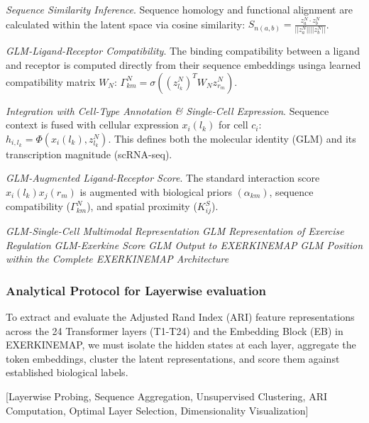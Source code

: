 \documentclass[11pt]{article}
\begin{document}
\textit{Sequence Similarity Inference}. Sequence homology and functional alignment are calculated within the latent space via cosine similarity: $S_{n(a,b)} = \frac{z_a^N \cdot z_b^N}{||z_a^N|| ||z_b^N||}$.

\textit{GLM-Ligand-Receptor Compatibility}. The binding compatibility between a ligand and receptor is computed directly from their sequence embeddings usinga learned compatibility matrix $W_N$:
$\Gamma_{km}^N = \sigma((z_{l_k}^N)^TW_Nz_{r_m}^N)$.

\textit{Integration with Cell-Type Annotation \& Single-Cell Expression}. Sequence context is fused with cellular expression $x_i(l_k)$ for cell $c_i$: $h_{i,l_k} = \Phi(x_i(l_k),z_{l_k}^N)$. This defines both the molecular identity (GLM) and its transcription magnitude (scRNA-seq).

\textit{GLM-Augmented Ligand-Receptor Score}. The standard interaction score $x_i(l_k)x_j(r_m)$ is augmented with biological priors $(\alpha_{km})$, sequence compatibility ($\Gamma^N_{km}$), and spatial proximity ($K^S_{ij}$).

\textit{GLM-Single-Cell Multimodal Representation}
\textit{GLM Representation of Exercise Regulation}
\textit{GLM-Exerkine Score}
\textit{GLM Output to EXERKINEMAP}
\textit{GLM Position within the Complete EXERKINEMAP Architecture}

\subsubsection{Analytical Protocol for Layerwise evaluation}
To extract and evaluate the Adjusted Rand Index (ARI) feature representations across the 24 Transformer layers (T1-T24) and the Embedding Block (EB) in EXERKINEMAP, we must isolate the hidden states at each layer, aggregate the token embeddings, cluster the latent representations, and score them against established biological labels.

[Layerwise Probing, Sequence Aggregation, Unsupervised Clustering, ARI Computation, Optimal Layer Selection, Dimensionality Visualization]
\end{document}
